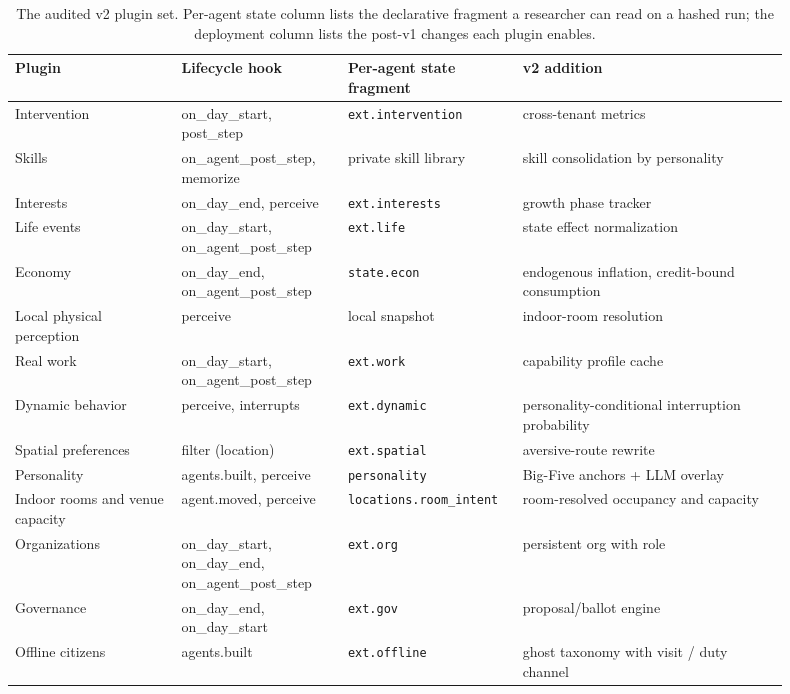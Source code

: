 \begin{table}[t]
\centering
\small
\setlength{\tabcolsep}{4pt}
\caption{The audited v2 plugin set.  Per-agent state column lists the
declarative fragment a researcher can read on a hashed run; the deployment
column lists the post-v1 changes each plugin enables.}
\label{tab:plugins}
\begin{tabular}{@{}p{0.20\linewidth}p{0.20\linewidth}p{0.18\linewidth}p{0.32\linewidth}@{}}
\toprule
Plugin & Lifecycle hook & Per-agent state fragment & v2 addition \\
\midrule
Intervention & on\_day\_start, post\_step & \texttt{ext.intervention} & cross-tenant metrics \\
Skills        & on\_agent\_post\_step, memorize & private skill library & skill consolidation by personality \\
Interests     & on\_day\_end, perceive & \texttt{ext.interests} & growth phase tracker \\
Life events   & on\_day\_start, on\_agent\_post\_step & \texttt{ext.life} & state effect normalization \\
Economy       & on\_day\_end, on\_agent\_post\_step & \texttt{state.econ} & endogenous inflation, credit-bound consumption \\
Local physical perception & perceive & local snapshot & indoor-room resolution \\
Real work     & on\_day\_start, on\_agent\_post\_step & \texttt{ext.work} & capability profile cache \\
Dynamic behavior & perceive, interrupts & \texttt{ext.dynamic} & personality-conditional interruption probability \\
Spatial preferences & filter (location) & \texttt{ext.spatial} & aversive-route rewrite \\
Personality   & agents.built, perceive & \texttt{personality} & Big-Five anchors + LLM overlay \\
Indoor rooms and venue capacity & agent.moved, perceive & \texttt{locations.room\_intent} & room-resolved occupancy and capacity \\
Organizations & on\_day\_start, on\_day\_end, on\_agent\_post\_step & \texttt{ext.org} & persistent org with role \\
Governance    & on\_day\_end, on\_day\_start & \texttt{ext.gov} & proposal/ballot engine \\
Offline citizens & agents.built & \texttt{ext.offline} & ghost taxonomy with visit / duty channel \\
\bottomrule
\end{tabular}
\end{table}

